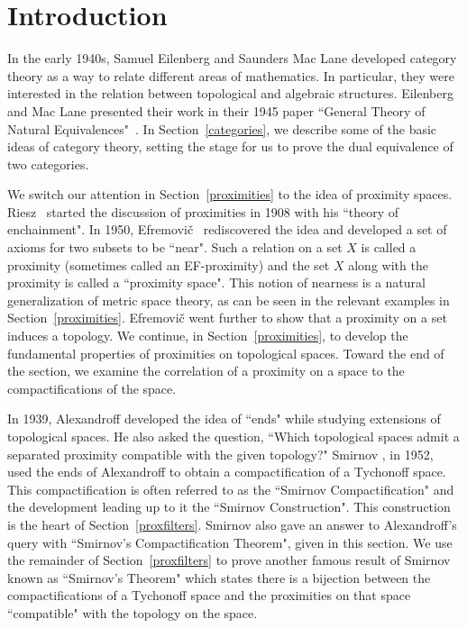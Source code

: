 \section{Introduction}

In the early 1940s, Samuel Eilenberg and Saunders Mac Lane developed category theory as a way to relate different areas of mathematics.  In particular, they were interested in the relation between topological and algebraic structures.  Eilenberg and Mac Lane presented their work in their 1945 paper ``General Theory of Natural Equivalences"~\cite{eilenbergmaclane}.  In Section~\ref{categories}, we describe some of the basic ideas of category theory, setting the stage for us to prove the dual equivalence of two categories.

We switch our attention in Section~\ref{proximities} to the idea of proximity spaces.  Riesz~\cite{riesz} started the discussion of proximities in 1908 with his ``theory of enchainment".  In 1950, Efremovi\v{c}~\cite{efremovic} rediscovered the idea and developed a set of axioms for two subsets to be ``near".  Such a relation on a set \( X \) is called a proximity (sometimes called an EF-proximity) and the set \( X \) along with the proximity is called a ``proximity space".  This notion of nearness is a natural generalization of metric space theory, as can be seen in the relevant examples in Section~\ref{proximities}.  Efremovi\v{c} went further to show that a proximity on a set induces a topology.  We continue, in Section~\ref{proximities}, to develop the fundamental properties of proximities on topological spaces.  Toward the end of the section, we examine the correlation of a proximity on a space to the compactifications of the space. \cite{naimpally}

In 1939, Alexandroff \cite{alexandroff} developed the idea of ``ends" while studying extensions of topological spaces.  He also asked the question, ``Which topological spaces admit a separated proximity compatible with the given topology?"  Smirnov \cite{smirnov}, in 1952, used the ends of Alexandroff to obtain a compactification of a Tychonoff space.  This compactification is often referred to as the ``Smirnov Compactification" and the development leading up to it the ``Smirnov Construction".  This construction is the heart of Section~\ref{proxfilters}.  Smirnov also gave an answer to Alexandroff's query with ``Smirnov's Compactification Theorem", given in this section.  We use the remainder of Section~\ref{proxfilters} to prove another famous result of Smirnov known as ``Smirnov's Theorem" which states there is a bijection between the compactifications of a Tychonoff space and the proximities on that space ``compatible" with the topology on the space.

